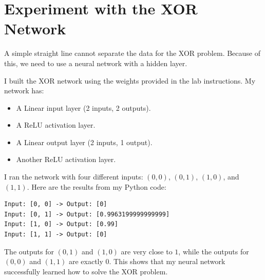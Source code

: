 \documentclass{article}
\begin{document}
\section{Experiment with the XOR Network}
A simple straight line cannot separate the data for the XOR problem. Because of this, we need to use a neural network with a hidden layer.

I built the XOR network using the weights provided in the lab instructions. My network has:
\begin{itemize}
    \item A Linear input layer (2 inputs, 2 outputs).
    \item A ReLU activation layer.
    \item A Linear output layer (2 inputs, 1 output).
    \item Another ReLU activation layer.
\end{itemize}

I ran the network with four different inputs: $(0,0)$, $(0,1)$, $(1,0)$, and $(1,1)$. Here are the results from my Python code:

\begin{verbatim}
Input: [0, 0] -> Output: [0]
Input: [0, 1] -> Output: [0.9963199999999999]
Input: [1, 0] -> Output: [0.99]
Input: [1, 1] -> Output: [0]
\end{verbatim}

The outputs for $(0,1)$ and $(1,0)$ are very close to $1$, while the outputs for $(0,0)$ and $(1,1)$ are exactly $0$. This shows that my neural network successfully learned how to solve the XOR problem.
\end{document}
